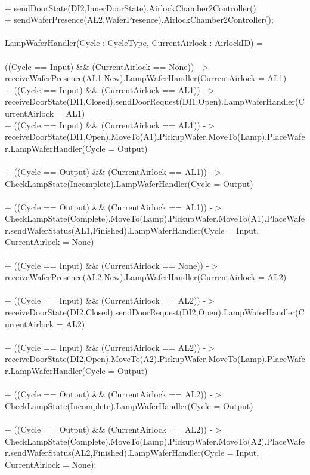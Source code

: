 \documentclass[a4paper,12pt]{article}
\begin{document}
\\+ sendDoorState(DI2,InnerDoorState).AirlockChamber2Controller()
\\+ sendWaferPresence(AL2,WaferPresence).AirlockChamber2Controller();
\\
\\LampWaferHandler(Cycle : CycleType, CurrentAirlock : AirlockID) = 
\\
\\((Cycle == Input) \&\& (CurrentAirlock == None)) -$>$ receiveWaferPresence(AL1,New).LampWaferHandler(CurrentAirlock = AL1)
\\+ ((Cycle == Input) \&\& (CurrentAirlock == AL1)) -$>$ receiveDoorState(DI1,Closed).sendDoorRequest(DI1,Open).LampWaferHandler(CurrentAirlock = AL1)
\\+ ((Cycle == Input) \&\& (CurrentAirlock == AL1)) -$>$ receiveDoorState(DI1,Open).MoveTo(A1).PickupWafer.MoveTo(Lamp).PlaceWafer.LampWaferHandler(Cycle = Output)
\\
\\+ ((Cycle == Output) \&\& (CurrentAirlock == AL1)) -$>$ CheckLampState(Incomplete).LampWaferHandler(Cycle = Output)
\\
\\+ ((Cycle == Output) \&\& (CurrentAirlock == AL1)) -$>$ CheckLampState(Complete).MoveTo(Lamp).PickupWafer.MoveTo(A1).PlaceWafer.sendWaferStatus(AL1,Finished).LampWaferHandler(Cycle = Input, CurrentAirlock = None)
\\
\\+ ((Cycle == Input) \&\& (CurrentAirlock == None)) -$>$ receiveWaferPresence(AL2,New).LampWaferHandler(CurrentAirlock = AL2)
\\
\\+ ((Cycle == Input) \&\& (CurrentAirlock == AL2)) -$>$ receiveDoorState(DI2,Closed).sendDoorRequest(DI2,Open).LampWaferHandler(CurrentAirlock = AL2)
\\
\\+ ((Cycle == Input) \&\& (CurrentAirlock == AL2)) -$>$ receiveDoorState(DI2,Open).MoveTo(A2).PickupWafer.MoveTo(Lamp).PlaceWafer.LampWaferHandler(Cycle = Output)
\\
\\+ ((Cycle == Output) \&\& (CurrentAirlock == AL2)) -$>$ CheckLampState(Incomplete).LampWaferHandler(Cycle = Output)
\\
\\+ ((Cycle == Output) \&\& (CurrentAirlock == AL2)) -$>$ CheckLampState(Complete).MoveTo(Lamp).PickupWafer.MoveTo(A2).PlaceWafer.sendWaferStatus(AL2,Finished).LampWaferHandler(Cycle = Input, CurrentAirlock = None);
\end{document}
